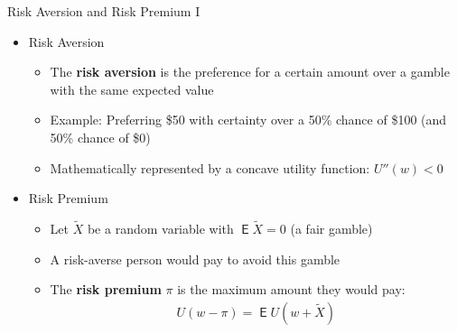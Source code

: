 \documentclass[10pt]{beamer}
\DeclareMathOperator\expc{\mathsf{E}}
\begin{document}
\begin{frame}{Risk Aversion and Risk Premium I}
  \begin{itemize}[<+->]
    \item Risk Aversion
      \begin{itemize}
        \item The \textbf{risk aversion} is the preference for a certain amount over a gamble with the same expected value
        \item Example: Preferring \$50 with certainty over a 50\% chance of \$100 (and 50\% chance of \$0)
        \item Mathematically represented by a concave utility function: $U''(w) < 0$
      \end{itemize}
    \item Risk Premium 
      \begin{itemize}
        \item Let $\widetilde{X}$ be a random variable with $\expc{\widetilde{X}} = 0$ (a fair gamble)
        \item A risk-averse person would pay to avoid this gamble
        \item The \textbf{risk premium} $\pi$ is the maximum amount they would pay:
          \begin{align}\label{eq:risk_premium}
            U(w - \pi) = \expc{U(w + \widetilde{X})}
          \end{align}
      \end{itemize}
  \end{itemize}
\end{frame}
\end{document}
